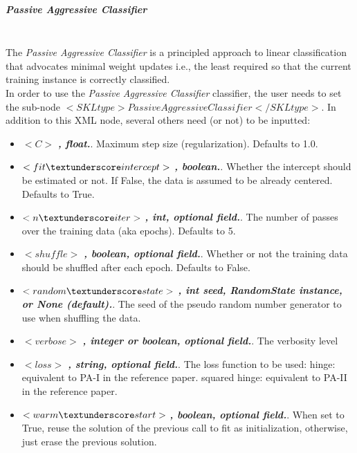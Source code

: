 \subparagraph{Passive Aggressive Classifier}
\mbox{}
\\The \textit{Passive Aggressive Classifier} is a principled approach to linear classification that advocates minimal weight updates i.e., the least required so that the current training instance is correctly classified.
\\In order to use the \textit{Passive Aggressive Classifier} classifier, the user needs to set the sub-node $<SKLtype>PassiveAggressiveClassifier</SKLtype>$.
In addition to this XML node, several others need (or not) to be inputted:
\begin{itemize}
  \item $<C>$ \textbf{\textit{, float.}}. Maximum step size (regularization). Defaults to 1.0.
  \item $<fit \textunderscore intercept>$ \textbf{\textit{, boolean.}}. Whether the intercept should be estimated or not. If False, the data is assumed to be already centered. Defaults to True.
  \item $<n \textunderscore iter>$ \textbf{\textit{, int, optional field.}}. The number of passes over the training data (aka epochs). Defaults to 5.
  \item $<shuffle>$ \textbf{\textit{, boolean, optional field.}}. Whether or not the training data should be shuffled after each epoch. Defaults to False.
  \item $<random \textunderscore state>$ \textbf{\textit{, int seed, RandomState instance, or None (default).}}. The seed of the pseudo random number generator to use when shuffling the data.
  \item $<verbose>$ \textbf{\textit{, integer or boolean, optional field.}}. The verbosity level
  \item $<loss>$ \textbf{\textit{, string, optional field.}}. The loss function to be used: hinge: equivalent to PA-I in the reference paper. squared \textunderscore hinge: equivalent to PA-II in the reference paper.
  \item $<warm \textunderscore start>$ \textbf{\textit{, boolean, optional field.}}. When set to True, reuse the solution of the previous call to fit as initialization, otherwise, just erase the previous solution.
\end{itemize}

